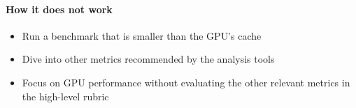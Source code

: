 \paragraph*{How it does not work}

\begin{itemize}[noitemsep]
  \item[$\boxminus$] Run a benchmark that is smaller than the GPU's cache
  \item[$\boxminus$] Dive into other metrics recommended by the analysis tools
  \item[$\boxminus$] Focus on GPU performance without evaluating the other relevant metrics in the high-level rubric
\end{itemize}




